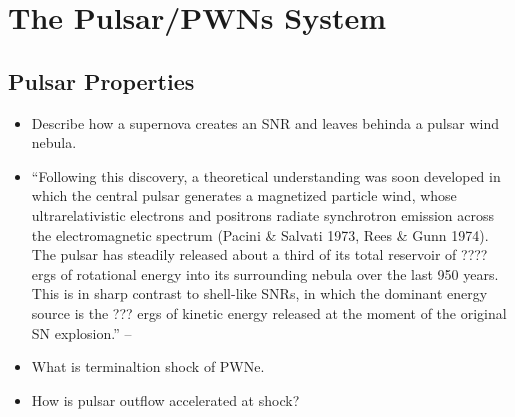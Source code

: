 \section{The Pulsar/\acp{PWN} System}

\subsection{Pulsar Properties}









\begin{itemize}
  \item Describe how a supernova creates an SNR and leaves behinda
    a pulsar wind nebula. 
  \item ``Following this discovery, a theoretical understanding was
  soon developed in which the central pulsar generates a magnetized
  particle wind, whose ultrarelativistic electrons and positrons radiate
  synchrotron emission across the electromagnetic spectrum (Pacini \&
  Salvati 1973, Rees \& Gunn 1974). The pulsar has steadily released
  about a third of its total reservoir of ???? ergs
  of rotational energy into its surrounding nebula over the last 950
  years. This is in sharp contrast to shell-like SNRs, in which the
  dominant energy source is the ??? ergs of kinetic energy
  released at the moment of the original SN explosion.''  -- \cite{gaensler_2006_evolution-structure}
  \item 
    What is terminaltion shock of PWNe.
  \item 
    How is pulsar outflow accelerated at shock?
\end{itemize}


